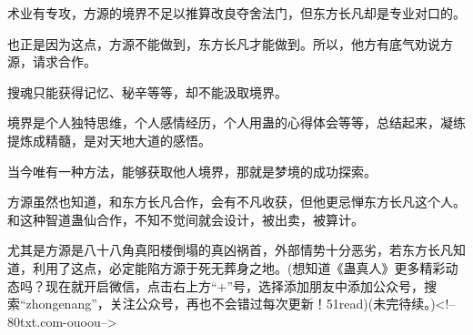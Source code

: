 \begin{this_body}
术业有专攻，方源的境界不足以推算改良夺舍法门，但东方长凡却是专业对口的。

也正是因为这点，方源不能做到，东方长凡才能做到。所以，他方有底气劝说方源，请求合作。

搜魂只能获得记忆、秘辛等等，却不能汲取境界。

境界是个人独特思维，个人感情经历，个人用蛊的心得体会等等，总结起来，凝练提炼成精髓，是对天地大道的感悟。

当今唯有一种方法，能够获取他人境界，那就是梦境的成功探索。

方源虽然也知道，和东方长凡合作，会有不凡收获，但他更忌惮东方长凡这个人。和这种智道蛊仙合作，不知不觉间就会设计，被出卖，被算计。

尤其是方源是八十八角真阳楼倒塌的真凶祸首，外部情势十分恶劣，若东方长凡知道，利用了这点，必定能陷方源于死无葬身之地。(想知道《蛊真人》更多精彩动态吗？现在就开启微信，点击右上方“+”号，选择添加朋友中添加公众号，搜索“zhongenang”，关注公众号，再也不会错过每次更新！51read)(未完待续。)<!--80txt.com-ouoou-->

\end{this_body}

